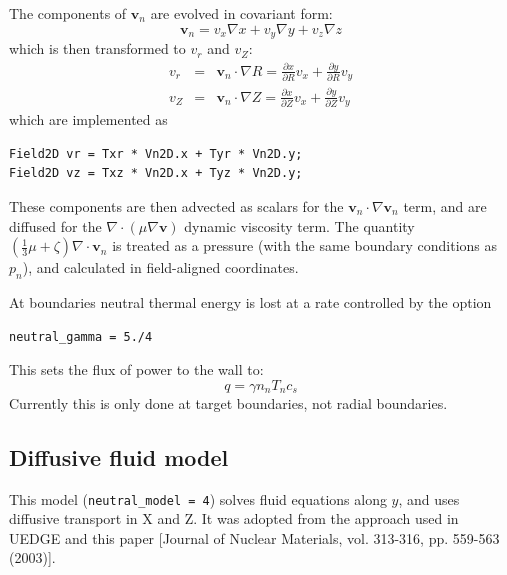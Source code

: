 \documentclass[12pt,a4paper]{article}
\begin{document}
The components of $\mathbf{v}_n$ are evolved in covariant form:
\begin{equation}
\mathbf{v}_n = v_x \nabla x + v_y \nabla y + v_z \nabla z
\end{equation}
which is then transformed to $v_r$ and $v_Z$:
\begin{eqnarray*}
v_r &=& \mathbf{v}_n \cdot \nabla R = \frac{\partial x}{\partial R} v_x + \frac{\partial y}{\partial R} v_y \\
v_Z &=& \mathbf{v}_n \cdot \nabla Z = \frac{\partial x}{\partial Z} v_x +  \frac{\partial y}{\partial Z} v_y
\end{eqnarray*}
which are implemented as
\begin{verbatim}
Field2D vr = Txr * Vn2D.x + Tyr * Vn2D.y;
Field2D vz = Txz * Vn2D.x + Tyz * Vn2D.y;
\end{verbatim}
These components are then advected as scalars for the $\mathbf{v}_n\cdot\nabla\mathbf{v}_n$ term, and are diffused for the $\nabla\cdot\left(\mu \nabla\mathbf{v}\right)$ dynamic viscosity term. The quantity $\left(\frac{1}{3}\mu + \zeta\right)\nabla\cdot\mathbf{v}_n$ is treated as a pressure (with the same boundary conditions as $p_n$), and calculated in field-aligned coordinates.


At boundaries neutral thermal energy is lost at a rate controlled by the option
\begin{verbatim}
neutral_gamma = 5./4
\end{verbatim}
This sets the flux of power to the wall to:
\[
q = \gamma n_n T_n c_s
\]
Currently this is only done at target boundaries, not radial boundaries.

\subsection{Diffusive fluid model}
\label{sec:uedgeneutrals}

This model (\texttt{neutral\_model = 4}) solves fluid equations along $y$, and uses diffusive transport in X and Z. 
It was adopted from the approach used in UEDGE and this paper [Journal of Nuclear Materials, vol. 313-316, pp. 559-563 (2003)].
\end{document}
